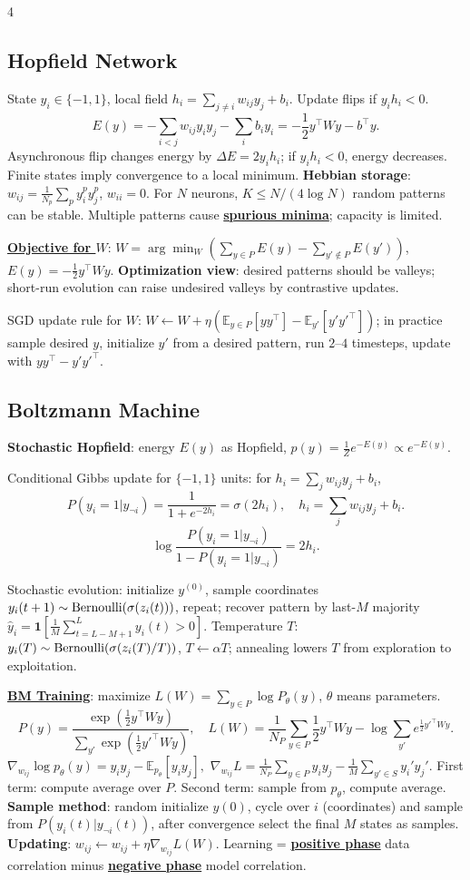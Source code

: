 \documentclass{article}
\newcommand{\key}[1]{\textbf{#1}}
\newcommand{\lowterm}[1]{\textbf{\underline{#1}}}
\newcommand{\E}{\mathbb{E}}
\newcommand{\1}{\mathbf 1}
\begin{document}
\begin{multicols*}{4}
\subsection{Hopfield Network}
State $y_i\in\{-1,1\}$, local field $h_i=\sum_{j\ne i}w_{ij}y_j+b_i$. Update flips if $y_ih_i<0$.
\[
E(y)=-\sum_{i<j}w_{ij}y_iy_j-\sum_i b_iy_i=-\frac12y^\top Wy-b^\top y.
\]
Asynchronous flip changes energy by $\Delta E=2y_ih_i$; if $y_ih_i<0$, energy decreases. Finite states imply convergence to a local minimum. \key{Hebbian storage}: $w_{ij}=\frac1{N_p}\sum_p y_i^py_j^p$, $w_{ii}=0$. For $N$ neurons, $K\le N/(4\log N)$ random patterns can be stable. Multiple patterns cause \lowterm{spurious minima}; capacity is limited.

\lowterm{Objective for $W$}: $W=\arg\min_W\left(\sum_{y\in P} E(y)-\sum_{y'\notin P}E(y')\right)$, $E(y)=-\frac12y^\top Wy$. 
\key{Optimization view}: desired patterns should be valleys; short-run evolution can raise undesired valleys by contrastive updates. 

SGD update rule for $W$: $W\gets W+\eta\left(\E_{y\in P}[yy^\top]-\E_{y'}[y'y'^\top]\right)$; in practice sample desired $y$, initialize $y'$ from a desired pattern, run $2$--$4$ timesteps, update with $yy^\top-y'y'^\top$.

\subsection{Boltzmann Machine}
\key{Stochastic Hopfield}: energy $E(y)$ as Hopfield, $p(y)=\frac{1}{Z}e^{-E(y)}\propto e^{-E(y)}$. 

Conditional Gibbs update for $\{-1,1\}$ units: for $h_i=\sum_jw_{ij}y_j+b_i$,
\[
P(y_i=1|y_{\neg i})=\frac{1}{1+e^{-2h_i}}
=\sigma(2h_i),
\quad h_i=\sum_jw_{ij}y_j+b_i.
\]
\[
\log\frac{P(y_i=1|y_{\neg i})}{1-P(y_i=1|y_{\neg i})}=2h_i.
\]

Stochastic evolution: initialize $y^{(0)}$, sample coordinates $y_i(t+1)\sim{\rm Bernoulli}(\sigma(z_i(t)))$, repeat; recover pattern by last-$M$ majority $\hat y_i=\1[\frac1M\sum_{t=L-M+1}^Ly_i(t)>0]$. Temperature $T$: $y_i(T)\sim{\rm Bernoulli}(\sigma(z_i(T)/T))$, $T\leftarrow\alpha T$; annealing lowers $T$ from exploration to exploitation. 

\lowterm{BM Training}: maximize $L(W)=\sum_{y\in P}\log P_\theta(y)$, $\theta$ means  parameters. 
\[
P(y)=\frac{\exp(\frac12y^\top Wy)}{\sum_{y'}\exp(\frac12y'^\top Wy)},\quad
L(W)=\frac1{N_P}\sum_{y\in P}\frac12y^\top Wy-\log\sum_{y'}e^{\frac12y'^\top Wy}.
\]
\(
\nabla_{w_{ij}}\log p_\theta(y)=y_iy_j-\E_{p_\theta}[y_iy_j],
\)
$\nabla_{w_{ij}}L=\frac1{N_P}\sum_{y\in P}y_iy_j-\frac1M\sum_{y'\in S}y_i'y_j'$. 
First term: compute average over $P$. Second term: sample from $p_\theta$, compute average. \key{Sample method}: random initialize $y(0)$, cycle over $i$ (coordinates) and sample from $P(y_i(t)|y_{\lnot i}(t))$, after convergence select the final $M$ states as samples. \key{Updating}: $w_{ij}\gets w_{ij}+\eta \nabla_{w_{ij}}L(W)$.
Learning = \lowterm{positive phase} data correlation minus \lowterm{negative phase} model correlation. 


\end{multicols*}
\end{document}
